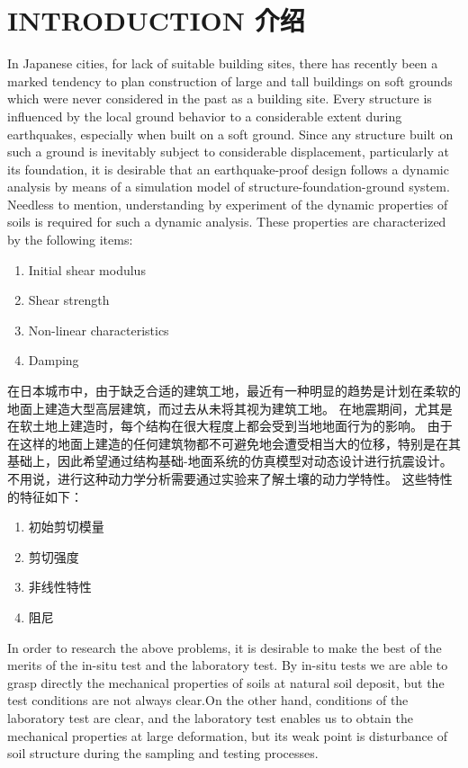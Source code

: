 \section*{INTRODUCTION 介绍}

\begin{paracol}{2}

    In Japanese cities, for lack of suitable building sites, there has recently been a marked tendency to plan construction of large and tall buildings on soft grounds which were never considered in the past as a building site. Every structure is influenced by the local ground behavior to a considerable extent during earthquakes, especially when built on a soft ground. Since any structure built on such a ground is inevitably subject to considerable displacement, particularly at its foundation, it is desirable that an earthquake-proof design follows a dynamic analysis by means of a simulation model of structure-foundation-ground system. Needless to mention, understanding by experiment of the dynamic properties of soils is required for such a dynamic analysis. These properties are characterized by the following items:
    \begin{enumerate}
        \item Initial shear modulus
        \item Shear strength
        \item Non-linear characteristics
        \item Damping
    \end{enumerate}

    \switchcolumn

    在日本城市中，由于缺乏合适的建筑工地，最近有一种明显的趋势是计划在柔软的地面上建造大型高层建筑，而过去从未将其视为建筑工地。 在地震期间，尤其是在软土地上建造时，每个结构在很大程度上都会受到当地地面行为的影响。 由于在这样的地面上建造的任何建筑物都不可避免地会遭受相当大的位移，特别是在其基础上，因此希望通过结构基础-地面系统的仿真模型对动态设计进行抗震设计。 不用说，进行这种动力学分析需要通过实验来了解土壤的动力学特性。 这些特性的特征如下：
    \begin{enumerate}
        \item 初始剪切模量
        \item 剪切强度
        \item 非线性特性
        \item 阻尼
    \end{enumerate}

    \switchcolumn*

    In order to research the above problems, it is desirable to make the best of the merits of the in-situ test and the laboratory test. By in-situ tests we are able to grasp directly the mechanical properties of soils at natural soil deposit, but the test conditions are not always clear.On the other hand, conditions of the laboratory test are clear, and the laboratory test enables us to obtain the mechanical properties at large deformation, but its weak point is disturbance of soil structure during the sampling and testing processes.
    

\end{paracol}
